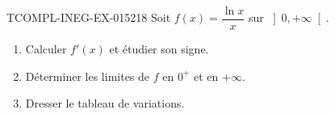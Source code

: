 \begin{exercice}{TCOMPL-INEG-EX-015}{2}{18}
Soit $f(x) = \dfrac{\ln x}{x}$ sur $\left]0, +\infty\right[$.
\begin{enumerate}
  \item Calculer $f'(x)$ et étudier son signe.
  \item Déterminer les limites de $f$ en $0^+$ et en $+\infty$.
  \item Dresser le tableau de variations.
\end{enumerate}

\end{exercice}
